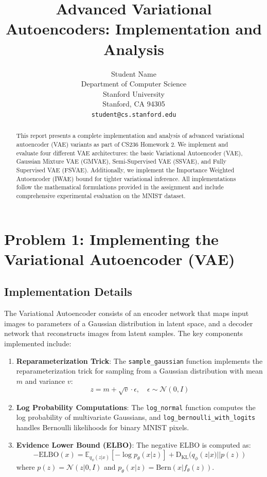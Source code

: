 \documentclass{article}
\title{Advanced Variational Autoencoders: Implementation and Analysis}
\author{
  Student Name\\
  Department of Computer Science\\
  Stanford University\\
  Stanford, CA 94305\\
  \texttt{student@cs.stanford.edu}
}
\begin{document}
\maketitle

\begin{abstract}
This report presents a complete implementation and analysis of advanced variational autoencoder (VAE) variants as part of CS236 Homework 2. We implement and evaluate four different VAE architectures: the basic Variational Autoencoder (VAE), Gaussian Mixture VAE (GMVAE), Semi-Supervised VAE (SSVAE), and Fully Supervised VAE (FSVAE). Additionally, we implement the Importance Weighted Autoencoder (IWAE) bound for tighter variational inference. All implementations follow the mathematical formulations provided in the assignment and include comprehensive experimental evaluation on the MNIST dataset.
\end{abstract}

\section{Problem 1: Implementing the Variational Autoencoder (VAE)}

\subsection{Implementation Details}

The Variational Autoencoder consists of an encoder network that maps input images to parameters of a Gaussian distribution in latent space, and a decoder network that reconstructs images from latent samples. The key components implemented include:

\begin{enumerate}
\item \textbf{Reparameterization Trick}: The \texttt{sample\_gaussian} function implements the reparameterization trick for sampling from a Gaussian distribution with mean $m$ and variance $v$:
\[
z = m + \sqrt{v} \cdot \epsilon, \quad \epsilon \sim \mathcal{N}(0, I)
\]

\item \textbf{Log Probability Computations}: The \texttt{log\_normal} function computes the log probability of multivariate Gaussians, and \texttt{log\_bernoulli\_with\_logits} handles Bernoulli likelihoods for binary MNIST pixels.

\item \textbf{Evidence Lower Bound (ELBO)}: The negative ELBO is computed as:
\[
-\text{ELBO}(x) = \mathbb{E}_{q_\phi(z|x)}[-\log p_\theta(x|z)] + \text{D}_\text{KL}(q_\phi(z|x)||p(z))
\]
where $p(z) = \mathcal{N}(z|0, I)$ and $p_\theta(x|z) = \text{Bern}(x|f_\theta(z))$.
\end{enumerate}
\end{document}
